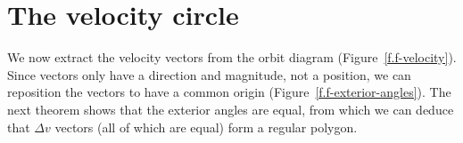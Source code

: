 
\section{The velocity circle}

We now extract the velocity vectors from the orbit diagram (Figure~\ref{f.f-velocity}). Since vectors only have a direction and magnitude, not a position, we can reposition the vectors to have a common origin (Figure~\ref{f.f-exterior-angles}). The next theorem shows that the exterior angles are equal, from which we can deduce that $\Delta v$ vectors (all of which are equal) form a regular polygon.


